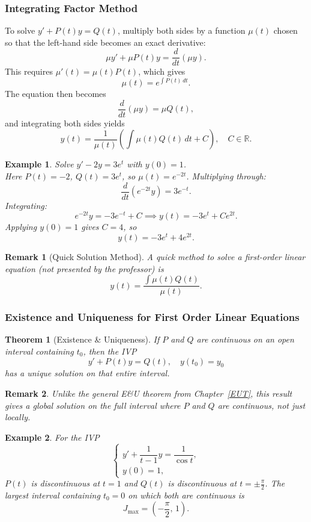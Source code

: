 \documentclass{article}
\newtheorem{theorem}{Theorem}
\newtheorem*{example}{Example}
\newtheorem{remark}{Remark}
\newcommand{\R}{\mathbb{R}}
\begin{document}
\subsubsection{Integrating Factor Method}
To solve $y' + P(t)y = Q(t)$, multiply both sides by a function $\mu(t)$ chosen so that the left-hand side becomes an exact derivative:
\[\mu y' + \mu P(t)y = \frac{d}{dt}(\mu y).\]
This requires $\mu'(t) = \mu(t)P(t)$, which gives
\[\mu(t) = e^{\int P(t)\,dt}.\]
The equation then becomes
\[\frac{d}{dt}(\mu y) = \mu Q(t),\]
and integrating both sides yields
\[y(t) = \frac{1}{\mu(t)}\left(\int \mu(t)Q(t)\,dt + C\right), \quad C \in \R.\]
\begin{example}
    Solve $y' - 2y = 3e^t$ with $y(0) = 1$.\\
    Here $P(t) = -2$, $Q(t) = 3e^t$, so $\mu(t) = e^{-2t}$. 
    Multiplying through:
    \[\frac{d}{dt}(e^{-2t}y) = 3e^{-t}.\]
    Integrating:
    \[e^{-2t}y = -3e^{-t} + C \implies y(t) = -3e^t + Ce^{2t}.\]
    Applying $y(0) = 1$ gives $C = 4$, so
    \[y(t) = -3e^t + 4e^{2t}.\]
\end{example}
\begin{remark}[Quick Solution Method]
    A quick method to solve a first-order linear equation (not presented by the professor) is
    \[y(t) = \frac{\int \mu(t) Q(t)}{\mu(t)}.\]
\end{remark}

\subsubsection{Existence and Uniqueness for First Order Linear Equations}
\begin{theorem}[Existence \& Uniqueness]
    If $P$ and $Q$ are continuous on an open interval containing $t_0$, then the IVP
    \[y' + P(t)y = Q(t), \quad y(t_0) = y_0\]
    has a unique solution on that entire interval.
\end{theorem}
\begin{remark}
    Unlike the general E\&U theorem from Chapter~\ref{EUT}, this result gives a global solution on the full interval where $P$ and $Q$ are continuous, not just locally.
\end{remark}
\begin{example}
    For the IVP
    \[\begin{cases}y' + \dfrac{1}{t-1}y = \dfrac{1}{\cos t},\\y(0) = 1,\end{cases}\]
    $P(t)$ is discontinuous at $t = 1$ and $Q(t)$ is discontinuous 
    at $t = \pm\frac{\pi}{2}$. The largest interval containing 
    $t_0 = 0$ on which both are continuous is
    \[J_{\max} = \left(-\frac{\pi}{2},\, 1\right).\]
\end{example}
\end{document}
